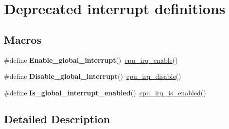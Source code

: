 \hypertarget{group__interrupt__deprecated__group}{}\section{Deprecated interrupt definitions}
\label{group__interrupt__deprecated__group}
\subsection*{Macros}
\begin{DoxyCompactItemize}
\item 
\hypertarget{group__interrupt__deprecated__group_gaebdc47e7800e11d79b9e5e2da1fecaa6}{}\#define {\bfseries Enable\+\_\+global\+\_\+interrupt}()~\hyperlink{group__interrupt__group_gae4922a4bd8ba4150211fbc7f2302403c}{cpu\+\_\+irq\+\_\+enable}()\label{group__interrupt__deprecated__group_gaebdc47e7800e11d79b9e5e2da1fecaa6}

\item 
\hypertarget{group__interrupt__deprecated__group_ga4834270e1b8984fe025bce15e7ae1564}{}\#define {\bfseries Disable\+\_\+global\+\_\+interrupt}()~\hyperlink{group__interrupt__group_ga7b77391ed86e2e027f9ee1dd99a06980}{cpu\+\_\+irq\+\_\+disable}()\label{group__interrupt__deprecated__group_ga4834270e1b8984fe025bce15e7ae1564}

\item 
\hypertarget{group__interrupt__deprecated__group_gab7b13c60d26b190e73e540586f1868f8}{}\#define {\bfseries Is\+\_\+global\+\_\+interrupt\+\_\+enabled}()~\hyperlink{group__interrupt__group_gae1545a2473614564550b9c4015c94978}{cpu\+\_\+irq\+\_\+is\+\_\+enabled}()\label{group__interrupt__deprecated__group_gab7b13c60d26b190e73e540586f1868f8}

\end{DoxyCompactItemize}


\subsection{Detailed Description}
